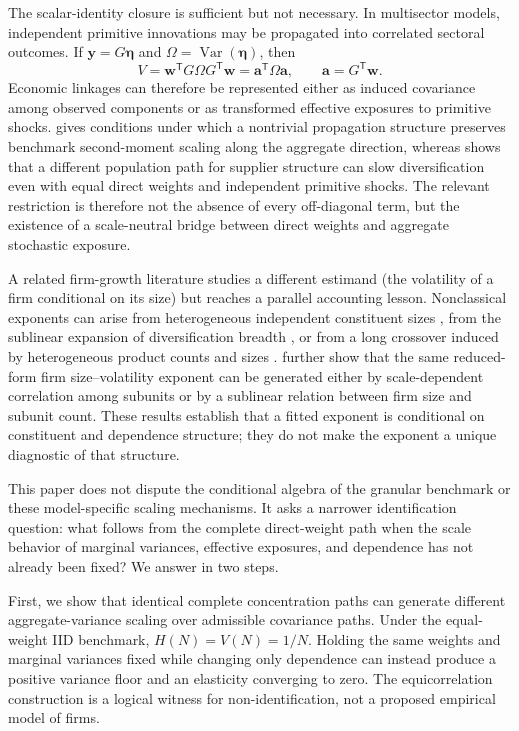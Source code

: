 {The scalar-identity closure is sufficient but not necessary. In
multisector models, independent primitive innovations may be propagated
into correlated sectoral outcomes. If $\mathbf{y}=G\boldsymbol{\eta}$
and $\Omega=\operatorname{Var}(\boldsymbol{\eta})$, then
\begin{equation}
\label{eq:effective_exposure_representation}
    V
    =
    \mathbf{w}^{\mathsf T}G\Omega G^{\mathsf T}\mathbf{w}
    =
    \mathbf{a}^{\mathsf T}\Omega\mathbf{a},
    \qquad
    \mathbf{a}=G^{\mathsf T}\mathbf{w}.
\end{equation}
Economic linkages can therefore be represented either as induced
covariance among observed components or as transformed effective
exposures to primitive shocks. \citet{dupor1999} gives conditions under
which a nontrivial propagation structure preserves benchmark
second-moment scaling along the aggregate direction, whereas
\citet{horvath1998} shows that a different population path for supplier
structure can slow diversification even with equal direct weights and
independent primitive shocks. The relevant restriction is therefore not
the absence of every off-diagonal term, but the existence of a
scale-neutral bridge between direct weights and aggregate stochastic
exposure.

A related firm-growth literature studies a different estimand (the
volatility of a firm conditional on its size) but reaches a parallel
accounting lesson. Nonclassical exponents can arise from heterogeneous
independent constituent sizes \citep{sutton2001}, from the sublinear
expansion of diversification breadth \citep{bottazziSecchi2006}, or from
a long crossover induced by heterogeneous product counts and sizes
\citep{riccaboniEtAl2008}. \citet{calvinoEtAl2018} further show that the
same reduced-form firm size--volatility exponent can be generated either
by scale-dependent correlation among subunits or by a sublinear relation
between firm size and subunit count. These results establish that a
fitted exponent is conditional on constituent and dependence structure;
they do not make the exponent a unique diagnostic of that structure.

This paper does not dispute the conditional algebra of the granular
benchmark or these model-specific scaling mechanisms. It asks a narrower
identification question: what follows from the complete direct-weight
path when the scale behavior of marginal variances, effective exposures,
and dependence has not already been fixed? We answer in two steps.

First, we show that identical complete concentration paths can generate
different aggregate-variance scaling over admissible covariance paths.
Under the equal-weight IID benchmark, $H(N)=V(N)=1/N$. Holding the same
weights and marginal variances fixed while changing only dependence can
instead produce a positive variance floor and an elasticity converging
to zero. The equicorrelation construction is a logical witness for
non-identification, not a proposed empirical model of firms.

}
